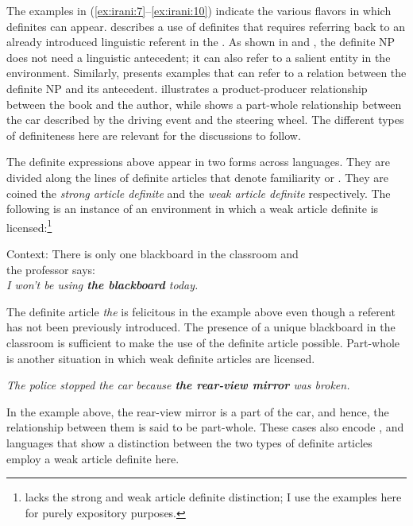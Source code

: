 \documentclass[output=paper,
modfonts
]{langscibook}
\begin{document}
The examples in (\ref{ex:irani:7}--\ref{ex:irani:10}) indicate the various flavors in which definites can appear.  describes a use of definites that requires referring back to an already introduced linguistic referent in the . As shown in  and , the definite NP does not need a linguistic antecedent; it can also refer to a salient entity in the environment. Similarly,  presents examples that can refer to a relation between the definite NP and its antecedent.  illustrates a product-producer  relationship between the book and the author, while  shows a part-whole relationship between the car described by the driving event and the steering wheel. The different types of definiteness here are relevant for the discussions to follow.

The definite expressions above appear in two forms across languages. They are divided along the lines of definite articles that denote familiarity or  \citep{Schwarz2009,Schwarz2013}. They are coined the \textit{strong article definite} and the \textit{weak article definite} respectively. The following is an instance of an environment in which a weak article definite is licensed:\footnote{ lacks the strong and weak article definite distinction; I use the examples here for purely expository purposes.}

\begin{exe}
\ex\label{ex:irani:11} Context: There is only one blackboard in the classroom and\\
the professor says:\\
\textit{I won't be using \textbf{the blackboard} today.}
\end{exe}

The definite article \textit{the} is felicitous in the example above even though a referent has not been previously introduced. The presence of a unique blackboard in the classroom is sufficient to make the use of the definite article possible. Part-whole  is another situation in which weak definite articles are licensed. 

\begin{exe} 
\ex\label{ex:irani:12} \textit{The police stopped the car because \textbf{the rear-view mirror} was broken.}
\end{exe} 

In the example above, the rear-view mirror is a part of the car, and hence, the relationship between them is said to be part-whole. These cases also encode , and languages that show a distinction between the two types of definite articles employ a weak article definite here. 
\end{document}
